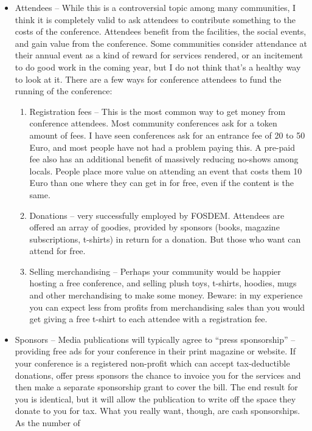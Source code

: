 \begin{itemize}
 \item Attendees -- While this is a controversial topic among many
communities, I think it is completely valid to ask attendees to
contribute something to the costs of the conference. Attendees benefit
from the facilities, the social events, and gain value from the conference.
Some communities consider attendance at their annual event as a kind of
reward for services rendered, or an incitement to do good work in the
coming year, but I do not think that's a healthy way to look at it.
There are a few ways for conference attendees to fund the running of
the conference:
 \begin{enumerate}
   \item Registration fees -- This is the most common way to get money from
conference attendees. Most community conferences ask for a token amount
of fees. I have seen conferences ask for an entrance fee of 20 to 50 Euro,
and most people have not had a problem paying this.
A pre-paid fee also has an additional benefit of massively reducing
no-shows among locals. People place more value on attending an event
that costs them 10 Euro than one where they can get in for free, even if the
content is the same.
   \item Donations -- very successfully employed by FOSDEM. Attendees are
offered an array of goodies, provided by sponsors (books, magazine
subscriptions, t-shirts) in return for a donation. But those who want
can attend for free.
   \item Selling merchandising -- Perhaps your community would be happier
hosting a free conference, and selling plush toys, t-shirts, hoodies,
mugs and other merchandising to make some money. Beware: in my
experience you can expect less from profits from merchandising sales
than you would get giving a free t-shirt to each attendee with a
registration fee.
 \end{enumerate}
 \item Sponsors -- Media publications will typically agree to ``press
sponsorship'' -- providing free ads for your conference in their print
magazine or website. If your conference is a registered non-profit which
can accept tax-deductible donations, offer press sponsors the chance to
invoice you for the services and then make a separate sponsorship grant
to cover the bill. The end result for you is identical, but it will
allow the publication to write off the space they donate to you for tax.
What you really want, though, are cash sponsorships. As the number of

\end{itemize}
